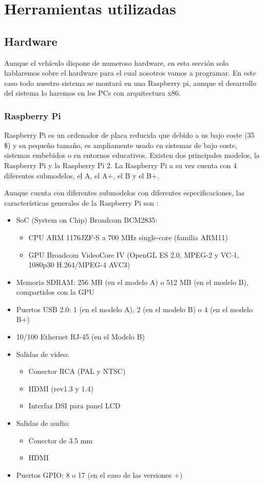 \chapter{Herramientas utilizadas}

\section{Hardware}
Aunque el vehículo dispone de numeroso hardware, en esta sección solo hablaremos sobre el hardware para el cual nosotros vamos a programar. En este caso todo nuestro sistema se montará en una Raspberry pi, aunque el desarrollo del sistema lo haremos en los PCs con arquitectura x86.

	\subsection{Raspberry Pi}
	Raspberry Pi es un ordenador de placa reducida que debido a us bajo coste (35 \$) y su pequeño tamaño, es ampliamente usado en sistemas de bajo coste, sistemas embebidos o en entornos educativos. Existen dos principales modelos, la Raspberry Pi y la Raspberry Pi 2. La Raspberry Pi a su vez cuenta con 4 diferentes submodelos, el A, el A+, el B y el B+.
	
	Aunque cuenta con diferentes submodelos con diferentes especificaciones, las características generales de la Raspberry Pi son \cite{rpi-wikipedia}:
	
	\begin{itemize}
		\item SoC (System on Chip) Broadcom BCM2835:
			\begin{itemize}
				\item CPU ARM 1176JZF-S a 700 MHz single-core (familia ARM11)
				\item GPU Broadcom VideoCore IV (OpenGL ES 2.0, MPEG-2 y VC-1, 1080p30 H.264/MPEG-4 AVC3)
			\end{itemize}
		\item Memoria SDRAM: 256 MB (en el modelo A) o 512 MB (en el modelo B), compartidos con la GPU
		\item Puertos USB 2.0: 1 (en el modelo A), 2 (en el modelo B) o 4 (en el modelo B+)
		\item 10/100 Ethernet RJ-45 (en el Modelo B)
		\item Salidas de video:
			\begin{itemize}
				\item Conector RCA (PAL y NTSC)
				\item HDMI (rev1.3 y 1.4)
				\item Interfaz DSI para panel LCD
			\end{itemize}
		\item Salidas de audio:
			\begin{itemize}
				\item Conector de 3.5 mm
				\item HDMI
			\end{itemize}
		\item Puertos GPIO: 8 o 17 (en el caso de las versiones +)
	\end{itemize}
	
